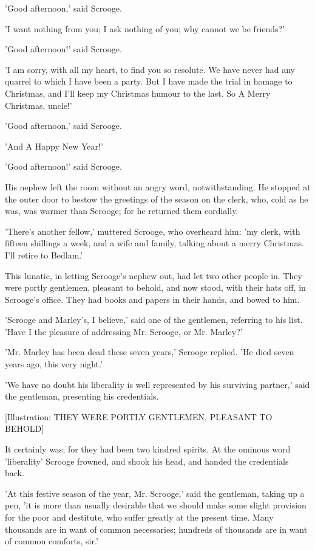 'Good afternoon,' said Scrooge.

'I want nothing from you; I ask nothing of you; why cannot we be
friends?'

'Good afternoon!' said Scrooge.

'I am sorry, with all my heart, to find you so resolute. We have never
had any quarrel to which I have been a party. But I have made the trial
in homage to Christmas, and I'll keep my Christmas humour to the last.
So A Merry Christmas, uncle!'

'Good afternoon,' said Scrooge.

'And A Happy New Year!'

'Good afternoon!' said Scrooge.

His nephew left the room without an angry word, notwithstanding. He
stopped at the outer door to bestow the greetings of the season on the
clerk, who, cold as he was, was warmer than Scrooge; for he returned
them cordially.

'There's another fellow,' muttered Scrooge, who overheard him: 'my
clerk, with fifteen shillings a week, and a wife and family, talking
about a merry Christmas. I'll retire to Bedlam.'

This lunatic, in letting Scrooge's nephew out, had let two other people
in. They were portly gentlemen, pleasant to behold, and now stood, with
their hats off, in Scrooge's office. They had books and papers in their
hands, and bowed to him.

'Scrooge and Marley's, I believe,' said one of the gentlemen, referring
to his list. 'Have I the pleasure of addressing Mr. Scrooge, or Mr.
Marley?'

'Mr. Marley has been dead these seven years,' Scrooge replied. 'He died
seven years ago, this very night.'

'We have no doubt his liberality is well represented by his surviving
partner,' said the gentleman, presenting his credentials.

[Illustration: THEY WERE PORTLY GENTLEMEN, PLEASANT TO BEHOLD]

It certainly was; for they had been two kindred spirits. At the ominous
word 'liberality' Scrooge frowned, and shook his head, and handed the
credentials back.

'At this festive season of the year, Mr. Scrooge,' said the gentleman,
taking up a pen, 'it is more than usually desirable that we should make
some slight provision for the poor and destitute, who suffer greatly at
the present time. Many thousands are in want of common necessaries;
hundreds of thousands are in want of common comforts, sir.'

